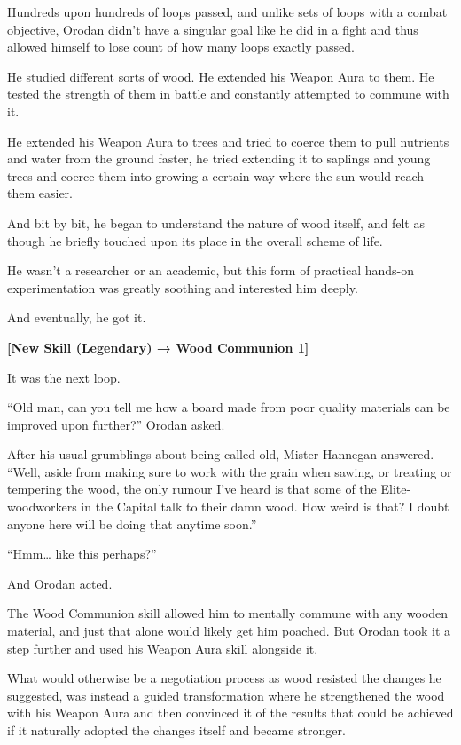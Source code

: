 \documentclass[a4paper,10pt]{book}
\begin{document}
Hundreds upon hundreds of loops passed, and unlike sets of loops with a combat objective, Orodan didn’t have a singular goal like he did in a fight and thus allowed himself to lose count of how many loops exactly passed.\par
He studied different sorts of wood. He extended his Weapon Aura to them. He tested the strength of them in battle and constantly attempted to commune with it.\par
He extended his Weapon Aura to trees and tried to coerce them to pull nutrients and water from the ground faster, he tried extending it to saplings and young trees and coerce them into growing a certain way where the sun would reach them easier.\par
And bit by bit, he began to understand the nature of wood itself, and felt as though he briefly touched upon its place in the overall scheme of life.\par
He wasn’t a researcher or an academic, but this form of practical hands-on experimentation was greatly soothing and interested him deeply.\par
And eventually, he got it.\par
\textbf{[New Skill (Legendary) → Wood Communion 1]}\par
It was the next loop.\par
“Old man, can you tell me how a board made from poor quality materials can be improved upon further?” Orodan asked.\par
After his usual grumblings about being called old, Mister Hannegan answered. “Well, aside from making sure to work with the grain when sawing, or treating or tempering the wood, the only rumour I’ve heard is that some of the Elite-woodworkers in the Capital talk to their damn wood. How weird is that? I doubt anyone here will be doing that anytime soon.”\par
“Hmm… like this perhaps?”\par
And Orodan acted.\par
The Wood Communion skill allowed him to mentally commune with any wooden material, and just that alone would likely get him poached. But Orodan took it a step further and used his Weapon Aura skill alongside it.\par
What would otherwise be a negotiation process as wood resisted the changes he suggested, was instead a guided transformation where he strengthened the wood with his Weapon Aura and then convinced it of the results that could be achieved if it naturally adopted the changes itself and became stronger.\par
\end{document}
